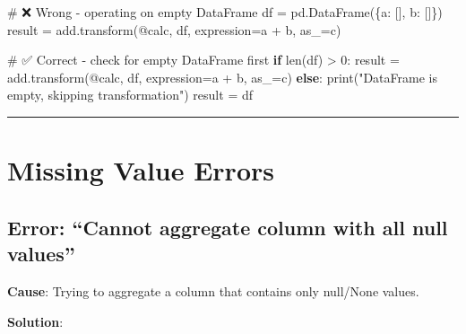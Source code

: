 \documentclass[
  letterpaper,
]{scrbook}
\newenvironment{Shaded}{\begin{snugshade}}{\end{snugshade}}
\newcommand{\BuiltInTok}[1]{\textcolor[rgb]{0.00,0.23,0.31}{#1}}
\newcommand{\CommentTok}[1]{\textcolor[rgb]{0.37,0.37,0.37}{#1}}
\newcommand{\ControlFlowTok}[1]{\textcolor[rgb]{0.00,0.23,0.31}{\textbf{#1}}}
\newcommand{\DecValTok}[1]{\textcolor[rgb]{0.68,0.00,0.00}{#1}}
\newcommand{\NormalTok}[1]{\textcolor[rgb]{0.00,0.23,0.31}{#1}}
\newcommand{\OperatorTok}[1]{\textcolor[rgb]{0.37,0.37,0.37}{#1}}
\newcommand{\StringTok}[1]{\textcolor[rgb]{0.13,0.47,0.30}{#1}}
\begin{document}
\begin{Shaded}
\begin{Highlighting}[]
\CommentTok{\# ❌ Wrong {-} operating on empty DataFrame}
\NormalTok{df }\OperatorTok{=}\NormalTok{ pd.DataFrame(\{}\StringTok{\textquotesingle{}a\textquotesingle{}}\NormalTok{: [], }\StringTok{\textquotesingle{}b\textquotesingle{}}\NormalTok{: []\})}
\NormalTok{result }\OperatorTok{=}\NormalTok{ add.transform(}\StringTok{\textquotesingle{}@calc\textquotesingle{}}\NormalTok{, df, expression}\OperatorTok{=}\StringTok{\textquotesingle{}a + b\textquotesingle{}}\NormalTok{, as\_}\OperatorTok{=}\StringTok{\textquotesingle{}c\textquotesingle{}}\NormalTok{)}

\CommentTok{\# ✅ Correct {-} check for empty DataFrame first}
\ControlFlowTok{if} \BuiltInTok{len}\NormalTok{(df) }\OperatorTok{\textgreater{}} \DecValTok{0}\NormalTok{:}
\NormalTok{    result }\OperatorTok{=}\NormalTok{ add.transform(}\StringTok{\textquotesingle{}@calc\textquotesingle{}}\NormalTok{, df, expression}\OperatorTok{=}\StringTok{\textquotesingle{}a + b\textquotesingle{}}\NormalTok{, as\_}\OperatorTok{=}\StringTok{\textquotesingle{}c\textquotesingle{}}\NormalTok{)}
\ControlFlowTok{else}\NormalTok{:}
    \BuiltInTok{print}\NormalTok{(}\StringTok{"DataFrame is empty, skipping transformation"}\NormalTok{)}
\NormalTok{    result }\OperatorTok{=}\NormalTok{ df}
\end{Highlighting}
\end{Shaded}

\begin{center}\rule{0.5\linewidth}{0.5pt}\end{center}

\section{Missing Value Errors}\label{missing-value-errors}

\subsection{Error: ``Cannot aggregate column with all null
values''}\label{error-cannot-aggregate-column-with-all-null-values}

\textbf{Cause}: Trying to aggregate a column that contains only
null/None values.

\textbf{Solution}:
\end{document}
